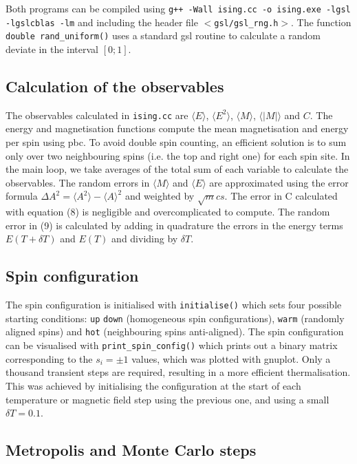 \documentclass[a4paper]{article}
\begin{document}
Both programs can be compiled using \verb;g++ -Wall ising.cc -o ising.exe -lgsl; \verb;-lgslcblas -lm; and including the header file $<$\verb+gsl/gsl_rng.h+$>$. The function \verb;double rand_uniform(); uses a standard gsl routine to calculate a random deviate in the interval $[0;1]$. 

\subsection{Calculation of the observables}

The observables calculated in \verb;ising.cc; are $\langle E \rangle$, $\langle E^2 \rangle$, $\langle M \rangle $, $\langle |M| \rangle$ and $C$. The energy and magnetisation functions compute the mean magnetisation and energy per spin using pbc. To avoid double spin counting, an efficient solution is to sum only over two neighbouring spins (i.e. the top and right one) for each spin site. In the main loop, we take averages of the total sum of each variable to calculate the observables. The random errors in $\langle M \rangle $ and $\langle E \rangle$ are approximated using the error formula ${\Delta A}^2 = \langle A^2 \rangle - {\langle A \rangle}^2 $ and weighted by $\sqrt mcs$. The error in C calculated with equation (8) is negligible and overcomplicated to compute. The random error in (9) is calculated by adding in quadrature the errors in the energy terms $E(T+ \delta T)$ and $E(T)$ and dividing by $\delta T$. 


\subsection{Spin configuration }

The spin configuration is initialised with \verb;initialise(); which sets four possible starting conditions: \verb;up;  \verb;down; (homogeneous spin configurations), \verb;warm; (randomly aligned spins) and \verb;hot; (neighbouring spins anti-aligned). The spin configuration can be visualised with \verb;print_spin_config(); which prints out a binary matrix corresponding to the $s_i = \pm 1$ values, which was plotted with gnuplot. Only a thousand transient steps are required, resulting in a more efficient thermalisation. This was achieved by initialising the configuration at the start of each temperature or magnetic field step using the previous one, and using a small $\delta T = 0.1$.

\subsection{Metropolis and Monte Carlo steps }
\end{document}
